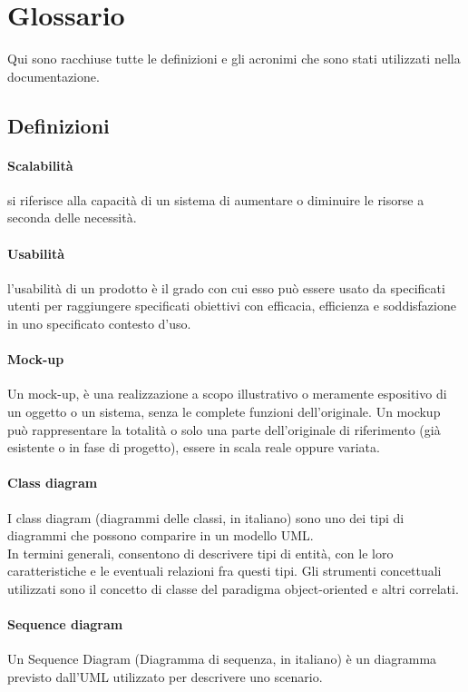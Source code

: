 \section{Glossario}
Qui sono racchiuse tutte le definizioni e gli acronimi che sono stati  utilizzati nella documentazione.
\subsection{Definizioni}

\paragraph{Scalabilità} si riferisce alla capacità di un sistema di aumentare o diminuire le risorse a seconda delle necessità.

\paragraph{Usabilità} l'usabilità di un prodotto è il grado con cui esso può essere usato da specificati utenti per
raggiungere specificati obiettivi con efficacia, efficienza e soddisfazione in uno specificato
contesto d'uso.
\paragraph{Mock-up} Un mock-up, è una realizzazione a scopo illustrativo o meramente espositivo di un oggetto o un sistema, senza le complete funzioni dell'originale. Un mockup può rappresentare la totalità o solo una parte dell'originale di riferimento (già esistente o in fase di progetto), essere in scala reale oppure variata.

\paragraph{Class diagram} I class diagram (diagrammi delle classi, in italiano) sono uno dei tipi di diagrammi che possono comparire in un modello UML.
\\
In termini generali, consentono di descrivere tipi di entità, con le loro caratteristiche e le eventuali relazioni fra questi tipi. Gli strumenti concettuali utilizzati sono il concetto di classe del paradigma object-oriented e altri correlati.
\paragraph{Sequence diagram} Un Sequence Diagram (Diagramma di sequenza, in italiano) è un diagramma previsto dall'UML utilizzato per descrivere uno scenario.

